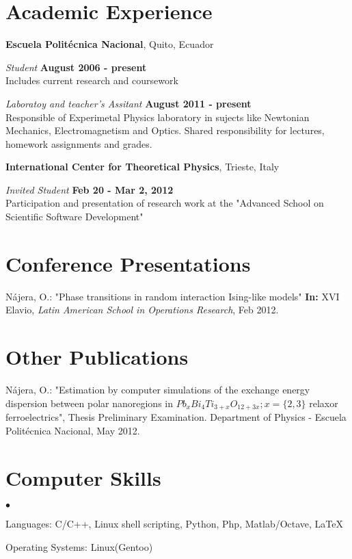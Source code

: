 \documentclass[margin,line]{res}
\newenvironment{list2}{
  \begin{list}{$\bullet$}{%
      \setlength{\itemsep}{0in}
      \setlength{\parsep}{0in} \setlength{\parskip}{0in}
      \setlength{\topsep}{0in} \setlength{\partopsep}{0in} 
      \setlength{\leftmargin}{0.2in}}}{\end{list}}
\begin{document}
\begin{resume}
\section{\sc Academic Experience}
{\bf Escuela Politécnica Nacional}, Quito, Ecuador

\vspace{-.3cm}
{\em Student} \hfill {\bf August 2006 - present}\\
Includes current research and coursework

{\em Laboratoy and teacher's Assitant} \hfill {\bf August 2011 - present}\\
Responsible of Experimetal Physics laboratory in sujects
like Newtonian Mechanics, Electromagnetism and Optics.
Shared responsibility for lectures, homework assignments and grades.

{\bf International Center for Theoretical Physics}, Trieste, Italy

\vspace{-.3cm}
{\em Invited Student} \hfill {\bf Feb 20 - Mar 2, 2012} \\
Participation and presentation of research work at the "Advanced School on Scientific Software Development"

\section{\sc Conference Presentations}
Nájera, O.: "Phase transitions in random interaction Ising-like models" {\bf In:} XVI Elavio, {\em Latin American School in Operations Research}, Feb 2012.

\section{\sc Other Publications}
Nájera, O.: "Estimation by computer simulations of the exchange energy dispersion between polar nanoregions in $Pb_xBi_4Ti_{3+x}O_{12+3x}; x=\{2,3\}$ relaxor ferroelectrics", Thesis Preliminary Examination. Department of Physics - Escuela Politécnica Nacional, May 2012.


\section{\sc Computer Skills} 
\begin{list2}
\item Languages:  C/C++, Linux shell scripting, Python, Php, Matlab/Octave, \LaTeX
\item Operating Systems:  Linux(Gentoo)
\end{list2}



\end{resume}
\end{document}
